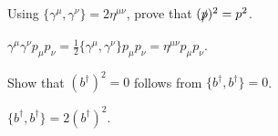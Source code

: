\begin{exercise}
Using \(\{\gamma^\mu,\gamma^\nu\}=2\eta^{\mu\nu}\), prove that \((\slashed p)^2=p^2\).
\begin{answer}
\(\gamma^\mu\gamma^\nu p_\mu p_\nu=\frac12\{\gamma^\mu,\gamma^\nu\}p_\mu p_\nu=\eta^{\mu\nu}p_\mu p_\nu\).
\end{answer}
\end{exercise}

\begin{exercise}
Show that \((b^\dagger)^2=0\) follows from \(\{b^\dagger,b^\dagger\}=0\).
\begin{answer}
\(\{b^\dagger,b^\dagger\}=2(b^\dagger)^2\).
\end{answer}
\end{exercise}

